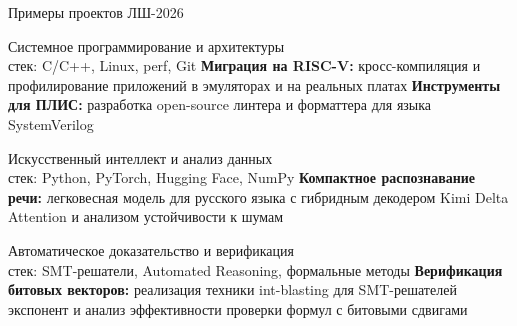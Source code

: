 \documentclass[xetex,mathserif,serif,aspectratio=1610]{beamer}
\begin{document}
    \begin{frame}{Примеры проектов ЛШ-2026}
        \begin{outline}
            \1 Системное программирование и архитектуры\\ стек: C/C++, Linux, perf, Git
                \2 \textbf{Миграция на RISC-V:} кросс-компиляция и профилирование приложений в эмуляторах и на реальных платах
                \2 \textbf{Инструменты для ПЛИС:} разработка open-source линтера и форматтера для языка SystemVerilog

            \1 Искусственный интеллект и анализ данных\\ стек: Python, PyTorch, Hugging Face, NumPy
                \2 \textbf{Компактное распознавание речи:} легковесная модель для русского языка с гибридным декодером Kimi Delta Attention и анализом устойчивости к шумам

            \1 Автоматическое доказательство и верификация\\ стек: SMT-решатели, Automated Reasoning, формальные методы
                \2 \textbf{Верификация битовых векторов:} реализация техники int-blasting для SMT-решателей экспонент и анализ эффективности проверки формул с битовыми сдвигами
        \end{outline}
    \end{frame}
\end{document}
